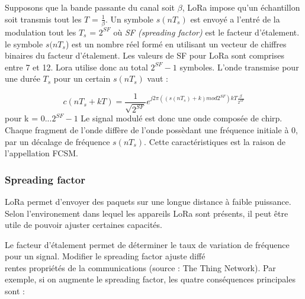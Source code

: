 \vspace{0.1cm}

Supposons que la bande passante du canal soit $\beta$, LoRa impose qu'un échantillon soit transmis tout les $T$ = $\frac{1}{\beta}$. Un symbole $s(nT_s)$ est envoyé a l'entré de la modulation tout les $T_s$ = $2^{SF}$ où \textit{SF (spreading factor)} est le facteur d'étalement. le symbole $s(nT_s$) est un nombre réel formé en utilisant un vecteur de chiffres binaires du facteur d'étalement. Les valeurs de SF pour LoRa sont comprises entre 7 et 12. Lora utilise donc au total $2^{SF}-1$ symboles. L'onde transmise pour une durée $T_s$ pour un certain $s(nT_s)$ vaut :

\begin{equation}
c(nT_s + kT) = \frac{1}{\sqrt{2^{SF}}} e^{j2\pi ((s(nT_s) +k )mod 2^{SF})kT \frac{\beta}{2^{SF}}}
\end{equation}
pour k = 0...$2^{SF}-1$
Le signal modulé est donc une onde composée de chirp. Chaque fragment de l'onde diffère de l'onde possèdant une fréquence initiale à 0, par un décalage de fréquence $s(nT_s)$. Cette caractéristiques est la raison de l'appellation FCSM.


\subsubsection{Spreading factor}

LoRa permet d'envoyer des paquets sur une longue distance à faible puissance. Selon l'environement dans lequel les appareils LoRa sont présents, il peut être utile de pouvoir ajuster certaines capacités.

\vspace{0.1cm}

Le facteur d'étalement permet de déterminer le taux de variation de fréquence pour un signal. Modifier le spreading factor ajuste diffé \\ rentes propriétés de la communications (source : The Thing Network\cite{thethingsnetworkSF}). Par exemple, si on augmente le spreading factor, les quatre conséquences principales sont :

\vspace{0.1cm}

